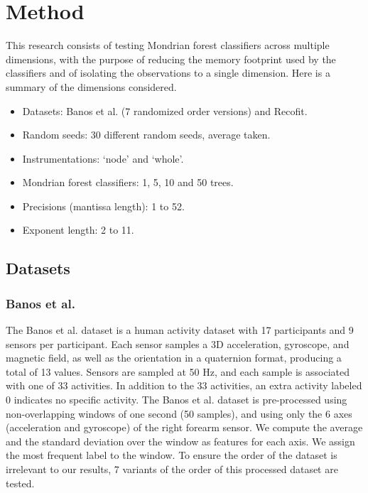\documentclass[conference]{IEEEtran}
\begin{document}
\section{Method}

This research consists of testing Mondrian forest classifiers across multiple
dimensions, with the purpose of reducing the memory footprint used by the
classifiers and of isolating the observations to a single dimension. Here is a
summary of the dimensions considered.
\begin{itemize}
    \item Datasets: Banos et al. (7 randomized order versions) and Recofit.
    \item Random seeds: 30 different random seeds, average taken.
    \item Instrumentations: ‘node’ and ‘whole’.
    \item Mondrian forest classifiers: 1, 5, 10 and 50 trees.
    \item Precisions (mantissa length): 1 to 52.
    \item Exponent length: 2 to 11.
\end{itemize}
\subsection{Datasets}

\subsubsection{Banos et al.}

The Banos et al. dataset \cite{banos2012benchmark,banos2014dealing} is a human
activity dataset with 17 participants and 9 sensors per participant. Each sensor
samples a 3D acceleration, gyroscope, and magnetic field, as well as the
orientation in a quaternion format, producing a total of 13 values. Sensors are
sampled at 50 Hz, and each sample is associated with one of 33 activities. In
addition to the 33 activities, an extra activity labeled 0 indicates no specific
activity. The Banos et al. dataset is pre-processed using non-overlapping
windows of one second (50 samples), and using only the 6 axes (acceleration and
gyroscope) of the right forearm sensor. We compute the average and the standard
deviation over the window as features for each axis. We assign the most frequent
label to the window. To ensure the order of the dataset is irrelevant to our
results, 7 variants of the order of this processed dataset are tested.
\end{document}
